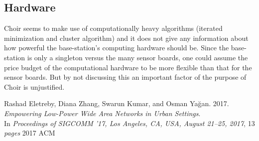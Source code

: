 \documentclass[a4paper,journal]{IEEEtran_custom}
\begin{document}
\subsection{Hardware}
Choir seems to make use of computationally heavy algorithms (iterated minimization and cluster algorithm) and it does not give any information about how powerful the base-station's computing hardware should be. Since the base-station is only a singleton versus the many sensor boards, one could assume the price budget of the computational hardware to be more flexible than that for the sensor boards. But by not discussing this an important factor of the purpose of Choir is unjustified.

\begin{thebibliography}{1}


Rashad Eletreby, Diana Zhang, Swarun Kumar, and Osman Yağan. 2017. \emph{Empowering
Low-Power Wide Area Networks in Urban Settings}. \\
In \emph{Proceedings
of SIGCOMM ’17, Los Angeles, CA, USA, August 21–25, 2017}, 13 \emph{pages}
2017 ACM

\end{thebibliography}
\end{document}
